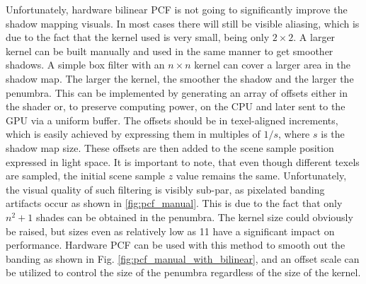 Unfortunately, hardware bilinear PCF is not going to significantly improve the shadow mapping visuals. In most cases there will still be visible aliasing, which is due to the fact that the kernel used is very small, being only \(2\times 2\). A larger kernel can be built manually and used in the same manner to get smoother shadows. A simple box filter with an \(n\times n\) kernel can cover a larger area in the shadow map. The larger the kernel, the smoother the shadow and the larger the penumbra. This can be implemented by generating an array of offsets either in the shader or, to preserve computing power, on the CPU and later sent to the GPU via a uniform buffer. The offsets should be in texel-aligned increments, which is easily achieved by expressing them in multiples of \(1/s\), where \(s\) is the shadow map size. These offsets are then added to the scene sample position expressed in light space. It is important to note, that even though different texels are sampled, the initial scene sample \(z\) value remains the same. Unfortunately, the visual quality of such filtering is visibly sub-par, as pixelated banding artifacts occur as shown in \ref{fig:pcf_manual}. This is due to the fact that only \(n^2+1\) shades can be obtained in the penumbra. The kernel size could obviously be raised, but sizes even as relatively low as 11 have a significant impact on performance. Hardware PCF can be used with this method to smooth out the banding as shown in Fig. \ref{fig:pcf_manual_with_bilinear}, and an offset scale can be utilized to control the size of the penumbra regardless of the size of the kernel.

